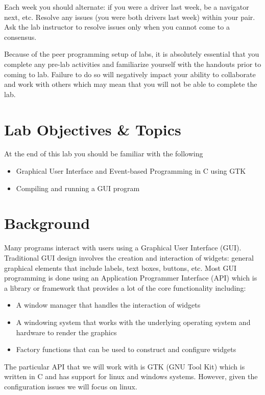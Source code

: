 \documentclass[12pt]{scrartcl}
\begin{document}
Each week you should alternate: if you were a driver last week, 
be a navigator next, etc.  Resolve any issues (you were both drivers
last week) within your pair.  Ask the lab instructor to resolve issues
only when you cannot come to a consensus.  

Because of the peer programming setup of labs, it is absolutely 
essential that you complete any pre-lab activities and familiarize
yourself with the handouts prior to coming to lab.  Failure to do
so will negatively impact your ability to collaborate and work with 
others which may mean that you will not be able to complete the
lab.  


\section{Lab Objectives \& Topics}
At the end of this lab you should be familiar with the following
\begin{itemize}
  \item Graphical User Interface and Event-based Programming in C using GTK
  \item Compiling and running a GUI program
\end{itemize}

\section{Background}

Many programs interact with users using a Graphical User 
Interface (GUI).  Traditional GUI design involves the creation 
and interaction of widgets: general graphical elements that 
include labels, text boxes, buttons, etc.  Most GUI programming 
is done using an Application Programmer Interface (API) 
which is a library or framework that provides a lot of the core 
functionality including:
\begin{itemize}
  \item A window manager that handles the interaction of widgets
  \item A windowing system that works with the underlying operating 
  	system and hardware to render the graphics
  \item Factory functions that can be used to construct and configure widgets
\end{itemize}
The particular API that we will work with is GTK (GNU Tool Kit) which 
is written in C and has support for linux and windows systems.  
However, given the configuration issues we will focus on linux.  
\end{document}

